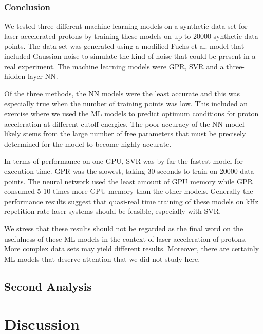 \subsubsection{Conclusion}

We tested three different machine learning models on a synthetic data set for laser-accelerated protons by training these models on up to 20000 synthetic data points. The data set was generated using a modified Fuchs et al. \cite{Fuchs_2005_Nat} model that included Gaussian noise to simulate the kind of noise that could be present in a real experiment. The machine learning models were \acrfull{GPR}, \acrfull{SVR} and a three-hidden-layer \acrfull{NN}. 

Of the three methods, the \gls{NN} models were the least accurate and this was especially true when the number of training points was low. This included an exercise where we used the \gls{ML} models to predict optimum conditions for proton acceleration at different cutoff energies. The poor accuracy of the \gls{NN} model likely stems from the large number of free parameters that must be precisely determined for the model to become highly accurate.

In terms of performance on one \gls{GPU}, \gls{SVR} was by far the fastest model for execution time. \gls{GPR} was the slowest, taking 30 seconds to train on 20000 data points. The neural network used the least amount of \gls{GPU} memory while \gls{GPR} consumed 5-10 times more \gls{GPU} memory than the other models. Generally the performance results suggest that quasi-real time training of these models on kHz repetition rate laser systems should be feasible, especially with \gls{SVR}.

We stress that these results should not be regarded as the final word on the usefulness of these ML models in the context of laser acceleration of protons. More complex data sets may yield different results. Moreover, there are certainly ML models that deserve attention that we did not study here. 

\subsection{Second Analysis}

\section{Discussion}